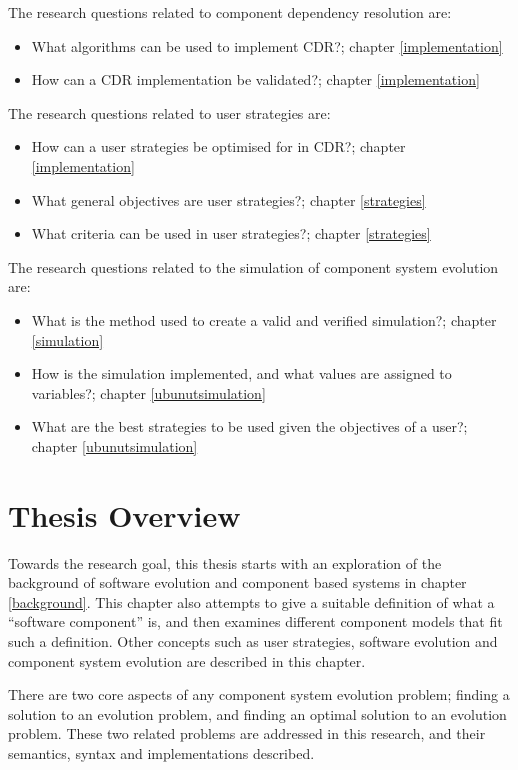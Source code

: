 The research questions related to component dependency resolution are:
\begin{itemize}
  \item What algorithms can be used to implement CDR?; chapter \ref{implementation}
  \item How can a CDR implementation be validated?; chapter \ref{implementation}
\end{itemize}

The research questions related to user strategies are: 
\begin{itemize}
	\item How can a user strategies be optimised for in CDR?; chapter \ref{implementation}
	\item What general objectives are user strategies?;  chapter \ref{strategies}
	\item What criteria can be used in user strategies?; chapter \ref{strategies}
\end{itemize}

The research questions related to the simulation of component system evolution are: 
\begin{itemize}
	\item What is the method used to create a valid and verified simulation?;  chapter \ref{simulation}
	\item How is the simulation implemented, and what values are assigned to variables?;  chapter \ref{ubunutsimulation}
	\item What are the best strategies to be used given the objectives of a user?;  chapter \ref{ubunutsimulation}
\end{itemize}

\section{Thesis Overview}
Towards the research goal, this thesis starts with an exploration of the background of software evolution and component based systems in chapter \ref{background}.
This chapter also attempts to give a suitable definition of what a ``software component'' is, and then examines different component models that fit such a definition.
Other concepts such as user strategies, software evolution and component system evolution are described in this chapter.

There are two core aspects of any component system evolution problem; 
finding a solution to an evolution problem, and finding an optimal solution to an evolution problem.
These two related problems are addressed in this research, and their semantics, syntax and implementations described.

